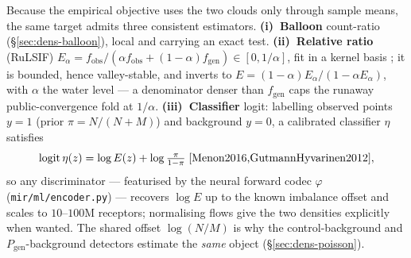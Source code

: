 \documentclass[11pt]{article}
\theoremstyle{oldplain}
\theoremstyle{oldrem}
\newcommand{\Pgen}{P_{\mathrm{gen}}}
\newcommand{\code}[1]{\texttt{#1}}
\begin{document}
Because the empirical objective uses the two clouds only through sample means, the same target admits three
consistent estimators. \textbf{(i)~Balloon} count-ratio (\S\ref{sec:dens-balloon}), local and carrying an
exact test. \textbf{(ii)~Relative ratio} (RuLSIF) $E_\alpha=f_{\mathrm{obs}}/(\alpha
f_{\mathrm{obs}}+(1-\alpha)f_{\mathrm{gen}})\in[0,1/\alpha]$, fit in a kernel basis \cite{Yamada2013}; it is
bounded, hence valley-stable, and inverts to $E=(1-\alpha)E_\alpha/(1-\alpha E_\alpha)$, with $\alpha$ the
water level --- a denominator denser than $f_{\mathrm{gen}}$ caps the runaway public-convergence fold at
$1/\alpha$. \textbf{(iii)~Classifier} logit: labelling observed points $y{=}1$ (prior $\pi=N/(N{+}M)$) and
background $y{=}0$, a calibrated classifier $\eta$ satisfies
\begin{equation}\label{eq:nce}
  \operatorname{logit}\eta(z)=\log E(z)+\log\tfrac{\pi}{1-\pi}
  \;\cite{Menon2016,GutmannHyvarinen2012},
\end{equation}
so any discriminator --- featurised by the neural forward codec $\varphi$ (\code{mir/ml/encoder.py}) ---
recovers $\log E$ up to the known imbalance offset and scales to $10$--$100$M receptors; normalising flows
\cite{Papamakarios2021} give the two densities explicitly when wanted. The shared offset $\log(N/M)$ is why
the control-background and $\Pgen$-background detectors estimate the \emph{same} object (\S\ref{sec:dens-poisson}).
\end{document}
